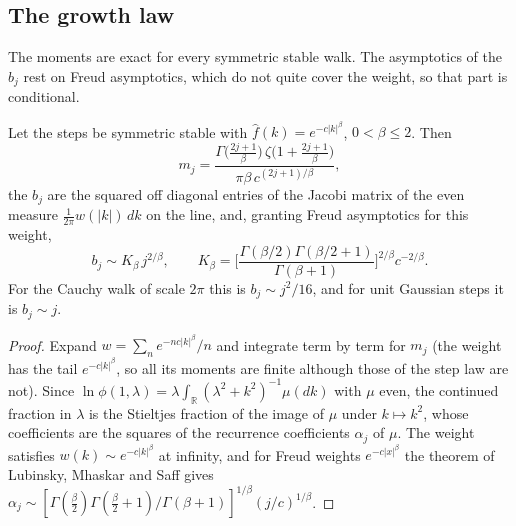 \subsection{The growth law}\label{cw:sec:growth}
The moments are exact for every symmetric stable walk. The asymptotics of the $b_j$ rest on Freud asymptotics, which do not quite cover the weight, so that part is conditional.

\begin{proposition}\label{cw:prop:growth}
Let the steps be symmetric stable with $\hat f(k)=e^{-c|k|^\beta}$, $0<\beta\le2$. Then
\[
m_j=\frac{\Gamma\big(\frac{2j+1}\beta\big)\,\zeta\big(1+\frac{2j+1}\beta\big)}{\pi\beta\,c^{(2j+1)/\beta}},
\]
the $b_j$ are the squared off diagonal entries of the Jacobi matrix of the even measure $\frac1{2\pi}w(|k|)\,dk$ on the line, and, granting Freud asymptotics for this weight,
\[
b_j\sim K_\beta\,j^{2/\beta},\qquad K_\beta=\Big[\frac{\Gamma(\beta/2)\Gamma(\beta/2+1)}{\Gamma(\beta+1)}\Big]^{2/\beta}c^{-2/\beta}.
\]
For the Cauchy walk of scale $2\pi$ this is $b_j\sim j^2/16$, and for unit Gaussian steps it is $b_j\sim j$.
\end{proposition}

\begin{proof}
Expand $w=\sum_ne^{-nc|k|^\beta}/n$ and integrate term by term for $m_j$ (the weight has the tail $e^{-c|k|^\beta}$, so all its moments are finite although those of the step law are not). Since $\ln\phi(1,\lambda)=\lambda\int_{\mathbb R}(\lambda^2+k^2)^{-1}\mu(dk)$ with $\mu$ even, the continued fraction in $\lambda$ is the Stieltjes fraction of the image of $\mu$ under $k\mapsto k^2$, whose coefficients are the squares of the recurrence coefficients $\alpha_j$ of $\mu$. The weight satisfies $w(k)\sim e^{-c|k|^\beta}$ at infinity, and for Freud weights $e^{-c|x|^\beta}$ the theorem of Lubinsky, Mhaskar and Saff gives $\alpha_j\sim[\Gamma(\frac\beta2)\Gamma(\frac\beta2+1)/\Gamma(\beta+1)]^{1/\beta}(j/c)^{1/\beta}$.
\end{proof}


